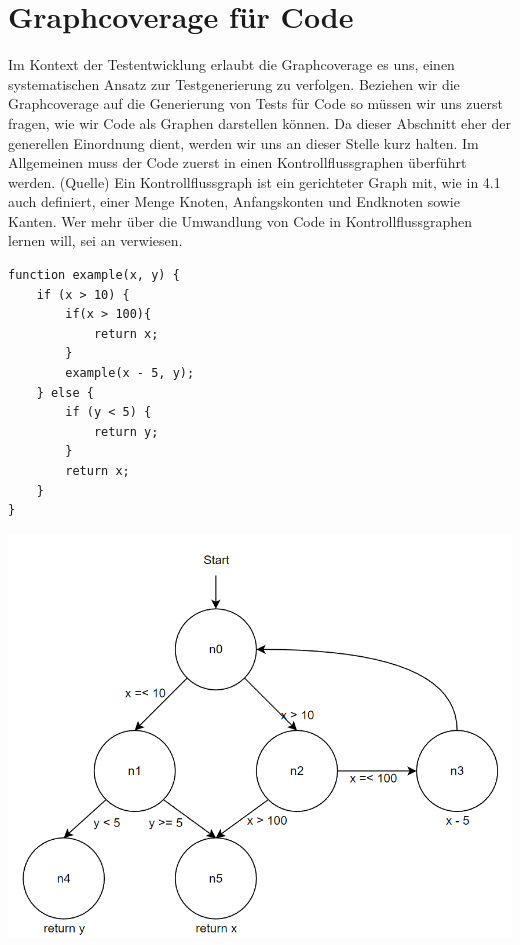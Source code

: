 \section{Graphcoverage für Code}

Im Kontext der Testentwicklung erlaubt die Graphcoverage es uns, einen systematischen Ansatz zur Testgenerierung zu verfolgen.
Beziehen wir die Graphcoverage auf die Generierung von Tests für Code so müssen wir uns zuerst fragen, wie wir Code
als Graphen darstellen können.
Da dieser Abschnitt eher der generellen Einordnung dient, werden wir uns an dieser Stelle kurz halten.
Im Allgemeinen muss der Code zuerst in einen Kontrollflussgraphen überführt werden. (Quelle)
Ein Kontrollflussgraph ist ein gerichteter Graph mit, wie in 4.1 auch definiert, einer Menge Knoten, Anfangskonten und Endknoten sowie Kanten.
Wer mehr über die Umwandlung von Code in Kontrollflussgraphen lernen will, sei an \cite[Kapitel 2.]{software-testing} verwiesen.


\begin{minipage}{.5\linewidth}
    \begin{lstlisting}
function example(x, y) {
    if (x > 10) {
        if(x > 100){
            return x;
        }
        example(x - 5, y);
    } else {
        if (y < 5) {
            return y;
        }
        return x;
    }
}
    \end{lstlisting}

\end{minipage}%
\begin{minipage}{.5\linewidth}
    \begin{center}
        \includegraphics[width=\textwidth,height=\textheight,keepaspectratio]{img/cfg}
    \end{center}
\end{minipage}

